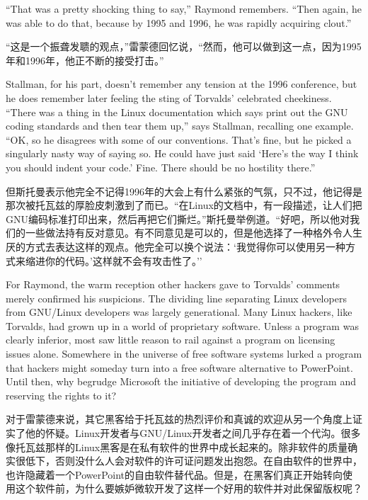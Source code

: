 \ifdefined\eng
``That was a pretty shocking thing to say,'' Raymond remembers. ``Then again, he was able to do that, because by 1995 and 1996, he was rapidly acquiring clout.''
\fi

\ifdefined\chs
``这是一个振聋发聩的观点，''雷蒙德回忆说，``然而，他可以做到这一点，因为1995年和1996年，他正不断的接受打击。''
\fi

\ifdefined\eng
Stallman, for his part, doesn't remember any tension at the 1996 conference, but he does remember later feeling the sting of Torvalds' celebrated cheekiness. ``There was a thing in the Linux documentation which says print out the GNU coding standards and then tear them up,'' says Stallman, recalling one example. ``OK, so he disagrees with some of our conventions. That's fine, but he picked a singularly nasty way of saying so. He could have just said `Here's the way I think you should indent your code.' Fine. There should be no hostility there.''
\fi

\ifdefined\chs
但斯托曼表示他完全不记得1996年的大会上有什么紧张的气氛，只不过，他记得是那次被托瓦兹的厚脸皮刺激到了而已。``在Linux的文档中，有一段描述，让人们把GNU编码标准打印出来，然后再把它们撕烂。''斯托曼举例道。``好吧，所以他对我们的一些做法持有反对意见。有不同意见是可以的，但是他选择了一种格外令人生厌的方式去表达这样的观点。他完全可以换个说法：`我觉得你可以使用另一种方式来缩进你的代码。'这样就不会有攻击性了。''
\fi

\ifdefined\eng
For Raymond, the warm reception other hackers gave to Torvalds' comments merely confirmed his suspicions. The dividing line separating Linux developers from GNU/Linux developers was largely generational. Many Linux hackers, like Torvalds, had grown up in a world of proprietary software. Unless a program was clearly inferior, most saw little reason to rail against a program on licensing issues alone. Somewhere in the universe of free software systems lurked a program that hackers might someday turn into a free software alternative to PowerPoint. Until then, why begrudge Microsoft the initiative of developing the program and reserving the rights to it?
\fi

\ifdefined\chs
对于雷蒙德来说，其它黑客给于托瓦兹的热烈评价和真诚的欢迎从另一个角度上证实了他的怀疑。Linux开发者与GNU/Linux开发者之间几乎存在着一个代沟。很多像托瓦兹那样的Linux黑客是在私有软件的世界中成长起来的。除非软件的质量确实很低下，否则没什么人会对软件的许可证问题发出抱怨。在自由软件的世界中，也许隐藏着一个PowerPoint的自由软件替代品。但是，在黑客们真正开始转向使用这个软件前，为什么要嫉妒微软开发了这样一个好用的软件并对此保留版权呢？
\fi

